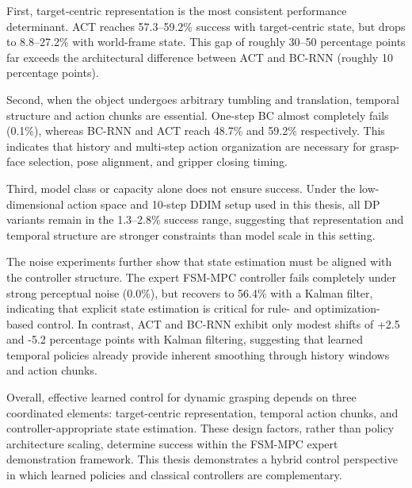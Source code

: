 First, target-centric representation is the most consistent performance determinant. ACT reaches 57.3--59.2\% success with target-centric state, but drops to 8.8--27.2\% with world-frame state. This gap of roughly 30--50 percentage points far exceeds the architectural difference between ACT and BC-RNN (roughly 10 percentage points).

Second, when the object undergoes arbitrary tumbling and translation, temporal structure and action chunks are essential. One-step BC almost completely fails (0.1\%), whereas BC-RNN and ACT reach 48.7\% and 59.2\% respectively. This indicates that history and multi-step action organization are necessary for grasp-face selection, pose alignment, and gripper closing timing.

Third, model class or capacity alone does not ensure success. Under the low-dimensional action space and 10-step DDIM setup used in this thesis, all DP variants remain in the 1.3--2.8\% success range, suggesting that representation and temporal structure are stronger constraints than model scale in this setting.

The noise experiments further show that state estimation must be aligned with the controller structure. The expert FSM-MPC controller fails completely under strong perceptual noise (0.0\%), but recovers to 56.4\% with a Kalman filter, indicating that explicit state estimation is critical for rule- and optimization-based control. In contrast, ACT and BC-RNN exhibit only modest shifts of +2.5 and -5.2 percentage points with Kalman filtering, suggesting that learned temporal policies already provide inherent smoothing through history windows and action chunks.

Overall, effective learned control for dynamic grasping depends on three coordinated elements: target-centric representation, temporal action chunks, and controller-appropriate state estimation. These design factors, rather than policy architecture scaling, determine success within the FSM-MPC expert demonstration framework. This thesis demonstrates a hybrid control perspective in which learned policies and classical controllers are complementary.

